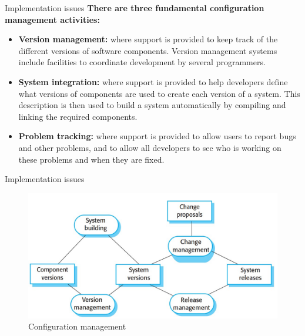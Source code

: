 \documentclass{beamer}
\begin{document}
\begin{frame}{Implementation issues}
	\textbf{There are three fundamental configuration management activities:}
	\begin{itemize}
		\item \textbf{Version management:} where support is provided to keep track of the different versions 
		of software components. Version management systems include facilities to coordinate 
		development by several programmers.
		\item \textbf{System integration:} where support is provided to help developers define what versions 
		of components are used to create each version of a system. This description is then used 
		to build a system automatically by compiling and linking the required components.
		\item \textbf{Problem tracking:} where support is provided to allow users to report bugs and other 
		problems, and to allow all developers to see who is working on these problems and when 
		they are fixed.
		
	\end{itemize}
\end{frame}

\begin{frame}{Implementation issues}
	\begin{figure}
		\includegraphics[scale=.45]{img/m3_14}
		\caption{Configuration 
			management}
	\end{figure}
	
\end{frame}
\end{document}
